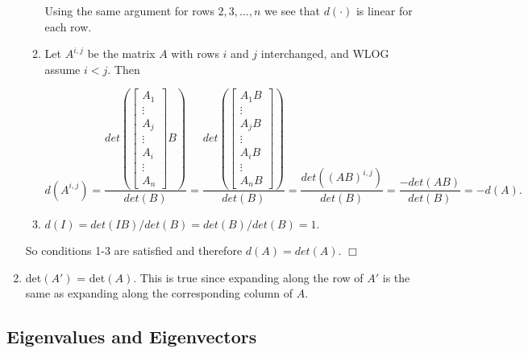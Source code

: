 \documentclass[12pt,oneside]{article}
\begin{document}
\begin{enumerate}
\begin{enumerate}[(1)]
Using the same argument for rows \(2,3,\dots,n\) we see that \(d(\cdot)\) is linear for each row.

\item Let \(A^{i,j}\) be the matrix \(A\)  with rows \(i\) and \(j\) interchanged, and WLOG assume \(i < j\). Then

$$
d(A^{i,j})
=\frac{det \left( \left[  \begin{array}{c} A_1 \\ \vdots \\ A_j \\ \vdots \\ A_i \\ \vdots \\ A_n \end{array} \right]B \right) }{det(B)}  
=\frac{ det \left( \left[  \begin{array}{c} A_1B \\ \vdots \\ A_jB \\ \vdots \\ A_iB \\ \vdots \\ A_nB \end{array} \right] \right)  }{det(B)}  
=\frac{det\left( (AB)^{i,j}\right)}{det(B)}=\frac{-det(AB)}{det(B)}=-d(A).
$$

\item $d(I) = det(IB)/det(B) = det(B)/det(B) = 1$.
\end{enumerate}
So conditions 1-3 are satisfied and therefore $d(A) = det(A)$. $\Box$



\item det$(A')$ = det$(A)$. This is true since expanding along the row
  of $A'$ is the same as expanding along the corresponding column of $A$.
\end{enumerate}


\subsection{Eigenvalues and Eigenvectors}
\end{document}
